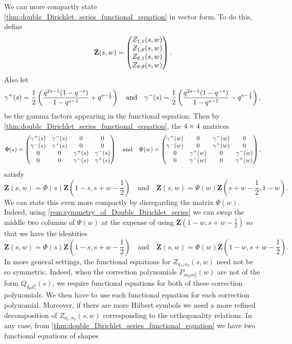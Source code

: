 \documentclass[12pt,reqno,oneside]{amsart}
\begin{document}
    We can more compactly state \cref{thm:double_Dirichlet_series_functional_equation} in vector form. To do this, define
    \[
        \mathbf{Z}(s,w) = \begin{pmatrix} Z_{1,1}(s,w) \\ Z_{1,\theta}(s,w) \\ Z_{\theta,1}(s,w) \\ Z_{\theta,\theta}(s,w) \end{pmatrix}.
    \]
    Also let
    \[
        \gamma^{+}(s) = \frac{1}{2}\left(\frac{q^{2s-1}(1-q^{-s})}{1-q^{s-1}}+q^{s-\frac{1}{2}}\right) \quad \text{and} \quad \gamma^{-}(s) = \frac{1}{2}\left(\frac{q^{2s-1}(1-q^{-s})}{1-q^{s-1}}-q^{s-\frac{1}{2}}\right),
    \]
    be the gamma factors appearing in the functional equation. Then by \cref{thm:double_Dirichlet_series_functional_equation}, the $4 \times 4$ matrices
    \[
        \Phi(s) = \begin{pmatrix} \gamma^{+}(s) & \gamma^{-}(s) & 0 & 0 \\ \gamma^{-}(s) & \gamma^{+}(s) & 0 & 0 \\ 0 & 0 & \gamma^{+}(s) & \gamma^{-}(s) \\ 0 & 0 & \gamma^{-}(s) & \gamma^{+}(s) \\ \end{pmatrix} \quad \text{and} \quad \Psi(w) = \begin{pmatrix} 
        \gamma^{+}(w) & 0 & \gamma^{-}(w) & 0 \\ 
        \gamma^{-}(w) & 0 & \gamma^{+}(w) & 0 \\ 
        0 & \gamma^{+}(w) & 0 & \gamma^{-}(w) \\ 
        0 & \gamma^{-}(w) & 0 & \gamma^{+}(w) \\ \end{pmatrix},
    \]
    satisfy
    \[
        \mathbf{Z}(s,w) = \Phi(s)\mathbf{Z}\left(1-s,s+w-\frac{1}{2}\right) \quad \text{and} \quad \mathbf{Z}(s,w) = \Psi(w)\mathbf{Z}\left(s+w-\frac{1}{2},1-w\right).
    \]
    We can state this even more compactly by disregarding the matrix $\Psi(w)$. Indeed, using \cref{rem:symmetry_of_Double_Dirichlet_series} we can swap the middle two columns of $\Psi(w)$ at the expense of using $\textbf{Z}\left(1-w,s+w-\frac{1}{2}\right)$ so that we have the identities
    \[
        \mathbf{Z}(s,w) = \Phi(s)\mathbf{Z}\left(1-s,s+w-\frac{1}{2}\right) \quad \text{and} \quad \mathbf{Z}(s,w) = \Phi(w)\mathbf{Z}\left(1-w,s+w-\frac{1}{2}\right).
    \]
    In more general settings, the functional equations for $Z_{a_{1},a_{2}}(s,w)$ need not be so symmetric. Indeed, when the correction polynomials $P_{m_{0}m_{1}^{2}}(w)$ are not of the form $Q_{d_{0}d_{1}^{2}}(s)$, we require functional equations for both of these correction polynomials. We then have to use each functional equation for each correction polynomial. Moreover, if there are more Hilbert symbols we need a more refined decomposition of $Z_{a_{1},a_{2}}(s,w)$ corresponding to the orthogonality relations. In any case, from \cref{thm:double_Dirichlet_series_functional_equation} we have two functional equations of shapes
\end{document}
